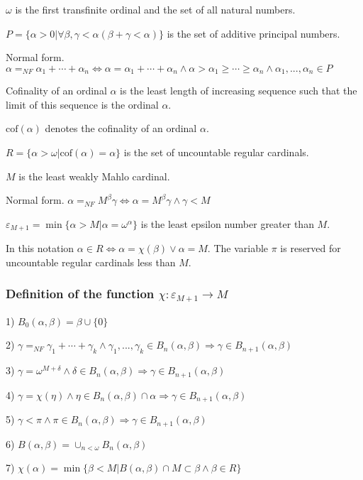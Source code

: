 \documentclass[10pt]{article}
\begin{document}
\(\omega\) is the first transfinite ordinal and the set of all natural numbers.

\(P=\{\alpha>0|\forall\beta,\gamma<\alpha(\beta+\gamma<\alpha)\}\) is the  set of additive principal numbers.

Normal form. \(\alpha=_{NF}\alpha_1+\cdots+\alpha_n\Leftrightarrow\alpha=\alpha_1+\cdots+\alpha_n\wedge\alpha>\alpha_1\geq\cdots\geq\alpha_n\wedge\alpha_1,...,\alpha_n\in P\)

Cofinality of an ordinal \(\alpha\) is the least length of increasing sequence such that the limit of this sequence is the ordinal \(\alpha\). 

\(\text{cof}(\alpha)\) denotes the cofinality of an ordinal \(\alpha\).

\(R=\{\alpha>\omega|\text{cof}(\alpha)=\alpha\}\) is the set of uncountable regular cardinals.

\(M\) is the least weakly Mahlo cardinal. 

Normal form. \(\alpha=_{NF}M^\beta\gamma\Leftrightarrow\alpha=M^\beta\gamma\wedge\gamma<M\)

\(\varepsilon_{M+1}=\min\{\alpha>M|\alpha=\omega^\alpha\}\) is the least epsilon number greater than \(M\). 

In this notation \(\alpha\in R\Leftrightarrow\alpha=\chi(\beta)\vee\alpha=M\). The variable \(\pi\) is reserved for uncountable regular cardinals less than \(M\). 

\subsubsection{Definition of the function \(\chi:\varepsilon_{M+1}\rightarrow M\)}

1) \(B_0(\alpha,\beta)=\beta\cup\{0\}\)

2) \(\gamma=_{NF}\gamma_1+\cdots+\gamma_k\wedge\gamma_1,...,\gamma_k\in B_n(\alpha,\beta)\Rightarrow\gamma\in B_{n+1}(\alpha,\beta)\)

3) \(\gamma=\omega^{M+\delta}\wedge\delta\in B_n(\alpha,\beta)\Rightarrow\gamma\in B_{n+1}(\alpha,\beta)\)

4) \(\gamma=\chi(\eta)\wedge\eta\in B_n(\alpha,\beta)\cap\alpha \Rightarrow\gamma\in B_{n+1}(\alpha,\beta)\)

5) \(\gamma<\pi\wedge\pi\in B_n(\alpha,\beta) \Rightarrow\gamma\in B_{n+1}(\alpha,\beta)\)

6) \(B(\alpha,\beta)=\cup_{n<\omega}B_n(\alpha,\beta)\)

7) \(\chi(\alpha)=\min\{\beta<M|B(\alpha,\beta)\cap M\subset\beta\wedge\beta\in R\}\)
\end{document}
